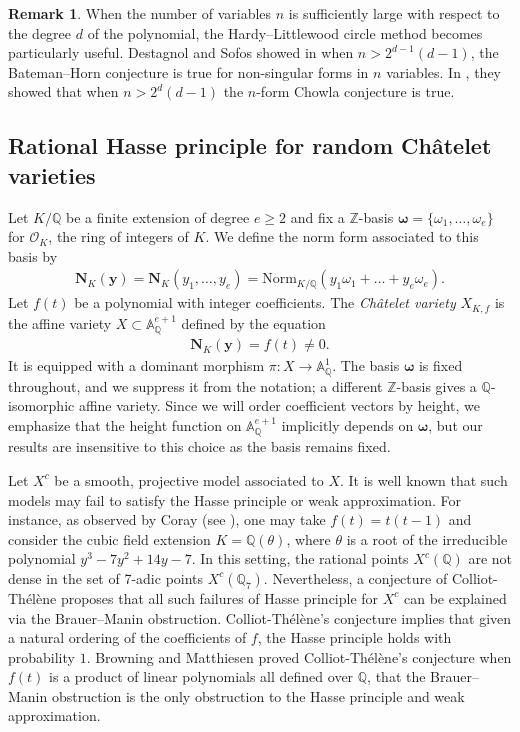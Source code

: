 \documentclass[reqno, 11pt]{amsart}
\renewcommand{\geq}{\geqslant}
\theoremstyle{definition}
\newtheorem{remark}[theorem]{Remark}
\theoremstyle{definition}
\renewcommand{\geq}{\geqslant}
\newcommand{\OO}{\mathcal{O}}
\newcommand{\AAA}{\mathbb{A}}
\newcommand{\QQ}{\mathbb{Q}}
\newcommand{\ZZ}{\mathbb{Z}}
\numberwithin{equation}{section}
\begin{document}
\begin{remark}
When the number of variables $n$ is sufficiently large with respect to the degree $d$ of the polynomial, the Hardy--Littlewood circle method becomes particularly useful.
	Destagnol and Sofos showed in \cite{D-S-1} when $n > 2^{d-1}(d-1)$, the Bateman--Horn conjecture is true for non-singular forms in $n$ variables. In \cite{D-S-2}, they showed that when $n > 2^d(d-1)$ the $n$-form Chowla conjecture is true.
\end{remark}





\subsection{Rational Hasse principle for random Ch\^atelet varieties}

Let $K/\QQ$ be a finite extension of degree $e \geq 2$ and fix a $\ZZ$-basis $\boldsymbol{\omega}=\{\omega_1, \dots, \omega_e\}$ for $\OO_K$, the ring of integers of $K$. We define the norm form associated to this basis by
\begin{eqnarray*}
	\mathbf{N}_K(\mathbf{y}) = \mathbf{N}_K(y_1, \dots, y_e) = \mathrm{Norm}_{K/\QQ}(y_1 \omega_1 + \dots + y_e\omega_e). 
\end{eqnarray*}
Let $f(t)$ be a polynomial with integer coefficients.
The {\it Ch\^atelet variety} $X_{K, f}$ is the affine variety $X \subset \AAA_\QQ^{e + 1}$ defined by the equation
\begin{eqnarray}\label{norm-f}
	\mathbf{N}_K(\mathbf{y}) = f(t) \neq 0.
\end{eqnarray}
It is equipped with a dominant morphism $\pi: X \rightarrow \AAA_\QQ^1$.
The basis $\boldsymbol{\omega}$ is fixed throughout, and we suppress it from the notation; a different $\ZZ$-basis gives a $\QQ$-isomorphic affine variety. Since we will order coefficient vectors by height, we emphasize that the height function on $\AAA_\QQ^{e+1}$ implicitly depends on $\boldsymbol{\omega}$, but our results are insensitive to this choice as the basis remains fixed.

Let \( X^c \) be a smooth, projective model associated to \( X \). It is well known that such models may fail to satisfy the Hasse principle or weak approximation. For instance, as observed by Coray (see \cite[Eq.~(8.2)]{CT-S}), one may take \( f(t) = t(t - 1) \) and consider the cubic field extension \( K = \mathbb{Q}(\theta) \), where \( \theta \) is a root of the irreducible polynomial \( y^3 - 7y^2 + 14y - 7 \). In this setting, the rational points \( X^c(\mathbb{Q}) \) are not dense in the set of 7-adic points \( X^c(\mathbb{Q}_7) \). Nevertheless, a conjecture of Colliot-Th\'el\`ene \cite{CT1} proposes that all such failures of Hasse principle for \( X^c \) can be explained via the Brauer--Manin obstruction. Colliot-Th\'el\`ene's conjecture implies that given a natural ordering of the coefficients of $f$, the Hasse principle holds with probability $1$. Browning and Matthiesen \cite{BL} proved Colliot-Th\'el\`ene's conjecture  when $f(t)$ is a product of linear polynomials all defined over $\QQ$, that the Brauer--Manin obstruction is the only obstruction to the Hasse principle and weak approximation.
\end{document}
